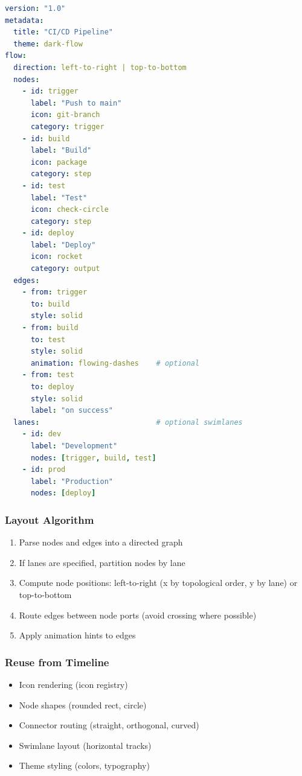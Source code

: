 \begin{lstlisting}[language=yaml,caption={Flow/Pipeline Domain IR (sketch)}]
version: "1.0"
metadata:
  title: "CI/CD Pipeline"
  theme: dark-flow
flow:
  direction: left-to-right | top-to-bottom
  nodes:
    - id: trigger
      label: "Push to main"
      icon: git-branch
      category: trigger
    - id: build
      label: "Build"
      icon: package
      category: step
    - id: test
      label: "Test"
      icon: check-circle
      category: step
    - id: deploy
      label: "Deploy"
      icon: rocket
      category: output
  edges:
    - from: trigger
      to: build
      style: solid
    - from: build
      to: test
      style: solid
      animation: flowing-dashes    # optional
    - from: test
      to: deploy
      style: solid
      label: "on success"
  lanes:                           # optional swimlanes
    - id: dev
      label: "Development"
      nodes: [trigger, build, test]
    - id: prod
      label: "Production"
      nodes: [deploy]
\end{lstlisting}

\subsubsection{Layout Algorithm}

\begin{enumerate}
  \item Parse nodes and edges into a directed graph
  \item If lanes are specified, partition nodes by lane
  \item Compute node positions: left-to-right (x by topological order, y by lane) or top-to-bottom
  \item Route edges between node ports (avoid crossing where possible)
  \item Apply animation hints to edges
\end{enumerate}

\subsubsection{Reuse from Timeline}

\begin{itemize}
  \item Icon rendering (icon registry)
  \item Node shapes (rounded rect, circle)
  \item Connector routing (straight, orthogonal, curved)
  \item Swimlane layout (horizontal tracks)
  \item Theme styling (colors, typography)
\end{itemize}

